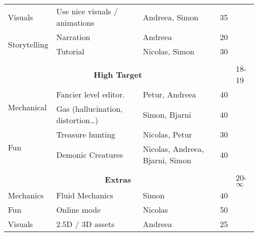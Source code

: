 \begin{table}[ht]
{\begin{tabular}{lllll}
Visuals                        & Use nice visuals / animations                            & Andreea, Simon                  & 35          &                   \\
\multirow{2}{*}{Storytelling}  & Narration                                                & Andreea                         & 20          &                   \\
                               & Tutorial                                                 & Nicolas, Simon                  & 30          &                   \\\\
\multicolumn{4}{c}{\textbf{High Target}}                                                                                                  & 18-19             \\
\multirow{2}{*}{Mechanical}    & Fancier level editor.                                    & Petur, Andreea                  & 40          &                   \\
                               & Gas (hallucination, distortion…)                         & Simon, Bjarni                   & 40          &                   \\
\multirow{2}{*}{Fun}           & Treasure hunting                                         & Nicolas, Petur                  & 30          &                   \\
                               & Demonic Creatures                                        & Nicolas, Andreea, Bjarni, Simon & 40          &                   \\\\
\multicolumn{4}{c}{\textbf{Extras}}                                                                                                       & 20-$\infty$        \\
Mechanics                      & Fluid Mechanics                                          & Simon                           & 40          &                   \\
Fun                            & Online mode                                              & Nicolas                         & 50          &                   \\
Visuals                        & 2.5D / 3D assets                                         & Andreea                         & 25          &                  
\end{tabular}
}
\end{table}